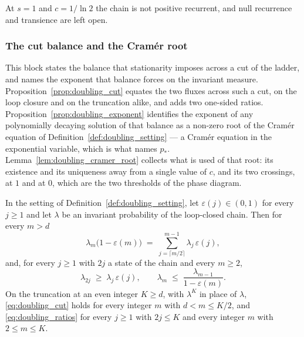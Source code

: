 At $s=1$ and $c=1/\ln2$ the chain is not positive recurrent, and null recurrence and
transience are left open.

\subsubsection{The cut balance and the Cram\'er root}

This block states the balance that stationarity imposes across a cut of the ladder, and names
the exponent that balance forces on the invariant measure. Proposition~\ref{prop:doubling_cut}
equates the two fluxes across such a cut, on the loop closure and on the truncation alike, and
adds two one-sided ratios. Proposition~\ref{prop:doubling_exponent} identifies the exponent of
any polynomially decaying solution of that balance as a non-zero root of the Cram\'er equation
of Definition~\ref{def:doubling_setting} --- a Cram\'er equation in the exponential variable,
which is what names $p_*$. Lemma~\ref{lem:doubling_cramer_root} collects what is used of that
root: its existence and its uniqueness away from a single value of $c$, and its two crossings,
at $1$ and at $0$, which are the two thresholds of the phase diagram.

\begin{proposition}\label{prop:doubling_cut}
In the setting of Definition~\ref{def:doubling_setting}, let $\varepsilon(j)\in(0,1)$ for
every $j\geq1$ and let $\lambda$ be an invariant probability of the loop-closed chain. Then
for every $m>d$
\begin{equation}\label{eq:doubling_cut}
    \lambda_m\bigl(1-\varepsilon(m)\bigr)\;=\;\sum_{j=\lceil m/2\rceil}^{m-1}\lambda_j\,\varepsilon(j),
\end{equation}
and, for every $j\geq1$ with $2j$ a state of the chain and every $m\geq2$,
\begin{equation}\label{eq:doubling_ratios}
    \lambda_{2j}\;\geq\;\lambda_j\,\varepsilon(j),
    \qquad
    \lambda_m\;\leq\;\frac{\lambda_{m-1}}{1-\varepsilon(m)} .
\end{equation}
On the truncation at an even integer $K\geq d$, with $\lambda^K$ in place of $\lambda$,
\eqref{eq:doubling_cut} holds for every integer $m$ with $d<m\leq K/2$, and
\eqref{eq:doubling_ratios} for every $j\geq1$ with $2j\leq K$ and every integer $m$ with
$2\leq m\leq K$.
\end{proposition}

